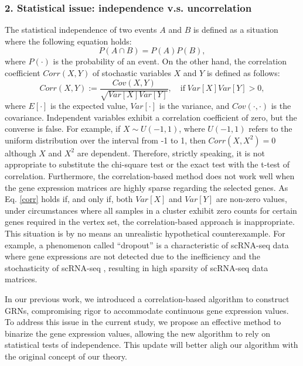 \documentclass{article}
\begin{document}
\subsubsection*{2. Statistical issue: independence v.s. uncorrelation}
The statistical independence of two events $A$ and $B$ is defined as a situation where the following equation holds:
\begin{equation}\label{independence}
  P(A\cap B)=P(A)P(B),
\end{equation}
where $P(\cdot)$ is the probability of an event. On the other hand, the correlation coefficient $Corr(X, Y)$ of stochastic variables 
$X$ and $Y$ is defined as follows:
\begin{equation}\label{corr}
  Corr(X, Y):=\frac{Cov(X, Y)}{\sqrt{Var[X]Var[Y]}},\quad \text{if}\; Var[X]Var[Y] > 0,
\end{equation}
where $E[\cdot]$ is the expected value, $Var[\cdot]$ is the variance, and $Cov(\cdot, \cdot)$ is the covariance. Independent variables exhibit 
a correlation coefficient of zero, but the converse is false. For example, if $X\sim U(-1, 1)$, where $U(-1, 1)$ refers to 
the uniform distribution over the interval from -1 to 1, then $Corr(X, X^2)=0$ although $X$ and $X^2$ are dependent. 
Therefore, strictly speaking, it is not appropriate to substitute the chi-square test or the exact test with the t-test 
of correlation. Furthermore, the correlation-based method does not work well when the gene expression matrices are 
highly sparse regarding the selected genes. As Eq. \eqref{corr} holds if, and only if, both $Var[X]$ and $Var[Y]$ are non-zero 
values, under circumstances where all samples in a cluster exhibit zero counts for certain genes required 
in the vertex set, the correlation-based approach is inappropriate. This situation is by no means an unrealistic 
hypothetical counterexample. For example, a phenomenon called ``dropout'' is a characteristic of scRNA-seq data 
where gene expressions are not detected due to the inefficiency and the stochasticity of scRNA-seq \cite{qiu2020embracing}, resulting 
in high sparsity of scRNA-seq data matrices.

In our previous work, we introduced a correlation-based algorithm to construct GRNs, compromising rigor to 
accommodate continuous gene expression values. To address this issue in the current study, we propose 
an effective method to binarize the gene expression values, allowing the new algorithm to rely on statistical tests of 
independence. This update will better aligh our algorithm with the original concept of our theory.
\end{document}
